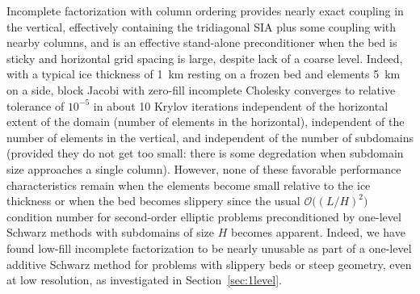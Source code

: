 \documentclass[draft,lineno,jgrga]{AGUTeX}
\newcommand{\bigO}{{\mathcal{O}}}
\begin{document}
\begin{article}
Incomplete factorization with column ordering provides nearly exact coupling in the vertical, effectively containing the tridiagonal SIA plus some coupling with nearby columns, and is an effective stand-alone preconditioner when the bed is sticky and horizontal grid spacing is large, despite lack of a coarse level.
Indeed, with a typical ice thickness of \SI{1}{\kilo\metre} resting on a frozen bed and elements \SI{5}{\kilo\metre} on
a side, block Jacobi with zero-fill incomplete Cholesky converges to relative tolerance of $10^{-5}$
in about 10 Krylov iterations independent of the horizontal extent of the domain (number of elements
in the horizontal), independent of the number of elements in the vertical, and independent of the
number of subdomains (provided they do not get too small: there is some degredation when subdomain
size approaches a single column).  However, none of these favorable performance characteristics
remain when the elements become small relative to the ice thickness or when the bed becomes
slippery since the usual $\bigO\big((L/H)^2\big)$ condition number for second-order elliptic problems
preconditioned by one-level Schwarz methods with subdomains of size $H$ \citep[see][]{smith1996domain} becomes apparent.
Indeed, we have found low-fill incomplete factorization to be nearly unusable as part of a one-level additive Schwarz method for problems with slippery beds or steep geometry, even at low resolution, as investigated in Section~\ref{sec:1level}.


\end{article}
\end{document}
